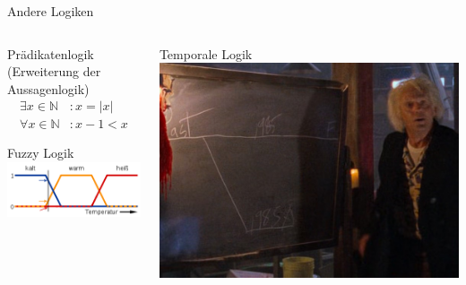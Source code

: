 \documentclass[xelatex,aspectratio=169]{beamer}
\begin{document}
\begin{frame}{Andere Logiken}
  \begin{columns}
    \begin{column}{0.5\textwidth}
      \begin{exampleblock}{Prädikatenlogik (Erweiterung der Aussagenlogik)}
        \begin{align*}
          \exists x \in \mathbb{N} & : x = \left|x\right| \\
          \forall x \in \mathbb{N} & : x - 1 < x
        \end{align*}
      \end{exampleblock}
      \begin{exampleblock}{Fuzzy Logik}
        \includegraphics[width=\textwidth]{img/fuzzy_logic.png}
      \end{exampleblock}
    \end{column}
    \begin{column}{0.5\textwidth}
      \begin{exampleblock}{Temporale Logik}
        \includegraphics[width=\textwidth]{img/temporal_logic_doc_brown.jpg}
      \end{exampleblock}
    \end{column}
  \end{columns}
\end{frame}
\end{document}
